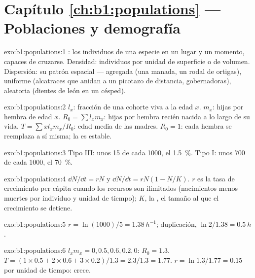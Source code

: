 \section*{Capítulo \ref{ch:b1:populations} --- Poblaciones y demografía}

\begin{solution}{exo:b1:populations:1}
: los individuos de una especie en un lugar y un momento, capaces
de cruzarse. Densidad: individuos por unidad de superficie o de volumen.
Dispersión: su patrón espacial --- agregada (una manada, un rodal de
ortigas), uniforme (alcatraces que anidan a un picotazo de distancia,
gobernadoras), aleatoria (dientes de león en un césped).
\end{solution}

\begin{solution}{exo:b1:populations:2}
$l_x$: fracción de una cohorte viva a la edad $x$. $m_x$: hijas por hembra
de edad $x$. $R_0 = \sum l_x m_x$: hijas por hembra recién nacida a lo largo
de su vida. $T = \sum x l_x m_x / R_0$: edad media de las madres.
$R_0 = 1$: cada hembra se reemplaza a sí misma; la  es estable.
\end{solution}

\begin{solution}{exo:b1:populations:3}
Tipo III: unos 15 de cada 1000, el \qty{1.5}{\%}. Tipo I: unos 700 de cada
1000, el \qty{70}{\%}.
\end{solution}

\begin{solution}{exo:b1:populations:4}
$\dd N/\dd t = rN$ y $\dd N/\dd t = rN(1 - N/K)$. $r$ es la tasa de
crecimiento per cápita cuando los recursos son ilimitados (nacimientos menos
muertes por individuo y unidad de tiempo); $K$, la , el
tamaño al que el crecimiento se detiene.
\end{solution}

\begin{solution}{exo:b1:populations:5}
$r = \ln(1000)/5 = \qty{1.38}{h^{-1}}$; duplicación, $\ln 2/1.38 =
\qty{0.5}{h}$.
\end{solution}

\begin{solution}{exo:b1:populations:6}
$l_x m_x = 0, 0.5, 0.6, 0.2, 0$: $R_0 = 1.3$. $T = (1\times 0.5 +
2\times 0.6 + 3\times 0.2)/1.3 = 2.3/1.3 = 1.77$. $r = \ln 1.3/1.77 =
\qty{0.15}{}$ por unidad de tiempo: crece.
\end{solution}


